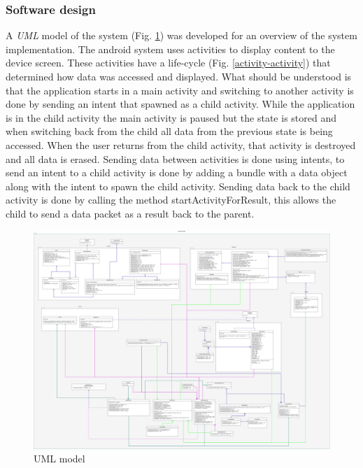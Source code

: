 \subsubsection{Software design}
A \textit{UML}\cite{uml} model of the system (Fig. \ref{android-uml}) was developed for an overview of the system implementation. The android system uses activities\cite{activity} to display content to the device screen. These activities have a life-cycle (Fig. \ref{activity-activity}) that determined how data was accessed and displayed. What should be understood is that the application starts in a main activity and switching to another activity is done by sending an intent that spawned as a child activity. While the application is in the child activity the main activity is paused but the state is stored and when switching back from the child all data from the previous state is being accessed. When the user returns from the child activity,  that activity is destroyed and all data is erased. Sending data between activities is done using intents, to send an intent to a child activity is done by adding a bundle with a data object along with the intent to spawn the child activity. Sending data back to the child activity is done by calling the method startActivityForResult, this allows the child to send a data packet as a result back to the parent. 
\begin{figure}[H]
\centering
\includegraphics[width=1\textwidth]{Figures/uml.png}
\caption{UML model}
\label{android-uml}
\end{figure}
